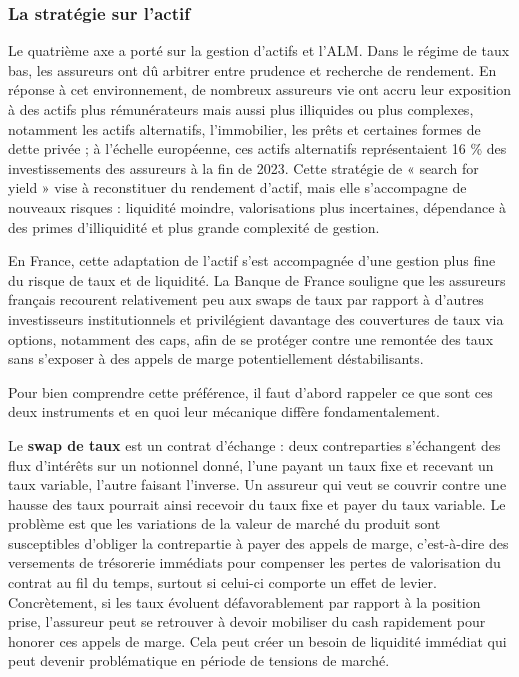 \subsubsection{La stratégie sur l'actif}

Le quatrième axe a porté sur la gestion d'actifs et l'ALM. Dans le régime de taux bas, les assureurs ont dû arbitrer entre prudence et recherche de rendement. En réponse à cet environnement, de nombreux assureurs vie ont accru leur exposition à des actifs plus rémunérateurs mais aussi plus illiquides ou plus complexes, notamment les actifs alternatifs, l'immobilier, les prêts et certaines formes de dette privée ; à l'échelle européenne, ces actifs alternatifs représentaient 16 \% des investissements des assureurs à la fin de 2023. Cette stratégie de « search for yield » vise à reconstituer du rendement d'actif, mais elle s'accompagne de nouveaux risques : liquidité moindre, valorisations plus incertaines, dépendance à des primes d'illiquidité et plus grande complexité de gestion.

En France, cette adaptation de l'actif s'est accompagnée d'une gestion plus fine du risque de taux et de liquidité. La Banque de France souligne que les assureurs français recourent relativement peu aux swaps de taux par rapport à d'autres investisseurs institutionnels et privilégient davantage des couvertures de taux via options, notamment des caps, afin de se protéger contre une remontée des taux sans s'exposer à des appels de marge potentiellement déstabilisants.

Pour bien comprendre cette préférence, il faut d'abord rappeler ce que sont ces deux instruments et en quoi leur mécanique diffère fondamentalement.

Le \textbf{swap de taux} est un contrat d'échange : deux contreparties s'échangent des flux d'intérêts sur un notionnel donné, l'une payant un taux fixe et recevant un taux variable, l'autre faisant l'inverse. Un assureur qui veut se couvrir contre une hausse des taux pourrait ainsi recevoir du taux fixe et payer du taux variable. Le problème est que les variations de la valeur de marché du produit sont susceptibles d'obliger la contrepartie à payer des appels de marge, c'est-à-dire des versements de trésorerie immédiats pour compenser les pertes de valorisation du contrat au fil du temps, surtout si celui-ci comporte un effet de levier. Concrètement, si les taux évoluent défavorablement par rapport à la position prise, l'assureur peut se retrouver à devoir mobiliser du cash rapidement pour honorer ces appels de marge. Cela peut créer un besoin de liquidité immédiat qui peut devenir problématique en période de tensions de marché.

